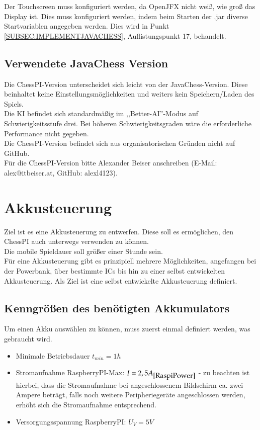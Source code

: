 \documentclass[12pt,a4paper]{article}
\begin{document}
Der Touchscreen muss konfiguriert werden, da OpenJFX nicht weiß, wie groß das Display ist. Dies muss konfiguriert werden, indem beim Starten der .jar diverse Startvariablen angegeben werden. Dies wird in Punkt \ref{SUBSEC:IMPLEMENTJAVACHESS}, Auflistungspunkt 17, behandelt.

\subsection{Verwendete JavaChess Version}
\label{SUBSEC:USEDJAVACHESS}

Die ChessPI-Version unterscheidet sich leicht von der JavaChess-Version. Diese beinhaltet keine Einstellungsmöglichkeiten und weiters kein Speichern/Laden des Spiels.\\
Die KI befindet sich standardmäßig im ,,Better-AI''-Modus auf Schwierigkeitsstufe drei. Bei höheren Schwierigkeitsgraden wäre die erforderliche Performance nicht gegeben.\\[2ex]
Die ChessPI-Version befindet sich aus organisatorischen Gründen nicht auf GitHub. \\Für die ChessPI-Version bitte Alexander Beiser anschreiben (E-Mail: alex@itbeiser.at, GitHub: alexl4123).

\clearpage\vfill\newpage{}
\section{Akkusteuerung}
\label{SEC:AKKUSTEUR}

Ziel ist es eine Akkusteuerung zu entwerfen. Diese soll es ermöglichen, den ChessPI auch unterwegs verwenden zu können. \\
Die mobile Spieldauer soll größer einer Stunde sein. \\[1ex]
Für eine Akkusteuerung gibt es prinzipiell mehrere Möglichkeiten, angefangen bei der Powerbank, über bestimmte ICs bis hin zu einer selbst entwickelten Akkusteuerung. Als Ziel ist eine selbst entwickelte Akkusteuerung definiert.\\

\subsection{Kenngrößen des benötigten Akkumulators}
\label{SUBSEC:AKKU-NEEDS}

Um einen Akku auswählen zu können, muss zuerst einmal definiert werden, was gebraucht wird.\\
\begin{itemize}
	\item{Minimale Betriebsdauer $t_{min}= 1h$}
	\item{Stromaufnahme RaspberryPI-Max: $I=2,5A_{\cite{RaspiPower}}$ - zu beachten ist hierbei, dass die Stromaufnahme bei angeschlossenem Bildschirm ca. zwei Ampere beträgt, falls noch weitere Peripheriegeräte angeschlossen werden, erhöht sich die Stromaufnahme entsprechend.}
	\item{Versorgungsspannung RaspberryPI: $U_V = 5V$}
\end{itemize}
\end{document}
